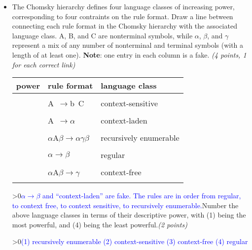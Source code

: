 \documentclass[12pt]{article}
\newcounter{showsolution}
\newcommand{\solution}[2]{\ifnum\value{showsolution}>0{\textcolor{blue}{#1}}\else{#2}\fi}
\begin{document}
\begin{itemize}
\item[2.]
The Chomsky hierarchy defines four language classes of increasing power, corresponding to four contraints on the rule format. 
Draw a line between connecting each rule format in the Chomsky hierarchy with the associated language class.
A, B, and C are nonterminal symbols, while $\alpha$, $\beta$, and $\gamma$ represent a mix of any number of nonterminal and terminal symbols (with a length of at least one). \textbf{Note}: one entry in each column is a fake.
\hfill{\em (4 points, 1 for each correct link)}\linebreak

\begin{table}[h]
\centering
\begin{tabular}{|l|p{2in}|p{2in}|}
\toprule
\textbf{power} & \textbf{rule format} & \textbf{language class} \\
\midrule
& & \\
& A\ $\rightarrow$b\ C
& context-sensitive
\\ & & \\
& A\ $\rightarrow\alpha$
& context-laden
\\ & & \\
& $\alpha$A$\beta\rightarrow\alpha\gamma\beta$
& recursively enumerable
\\ & & \\
& $\alpha\rightarrow\beta$
& regular
\\ & & \\
& $\alpha$A$\beta\rightarrow \gamma$
& context-free
\\ & & \\
\bottomrule
\end{tabular}
\end{table}

\solution{$\alpha\rightarrow\beta$ and ``context-laden'' are fake. The rules are in order from regular, to context free, to context sensitive, to recursively enumerable.}

\item[3.] Number the above language classes in terms of their descriptive power, with (1) being the most powerful, and (4) being the least powerful.\hfill{\em (2 points)}\linebreak

\solution{(1) recursively enumerable (2) context-sensitive (3) context-free (4) regular \vspace{2cm}}{\vspace{2cm}}





\end{itemize}
\end{document}
